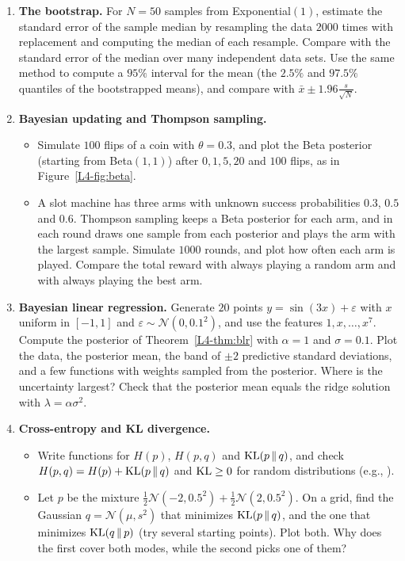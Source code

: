 \begin{enumerate}[label=\textbf{P\arabic*.}, leftmargin=*]
    \item \textbf{The bootstrap.} For $N = 50$ samples from Exponential$(1)$, estimate the standard error of the sample median by resampling the data $2000$ times with replacement and computing the median of each resample. Compare with the standard error of the median over many independent data sets. Use the same method to compute a $95\%$ interval for the mean (the $2.5\%$ and $97.5\%$ quantiles of the bootstrapped means), and compare with $\bar x \pm 1.96\frac{s}{\sqrt{N}}$.

    \item \homework{} \textbf{Bayesian updating and Thompson sampling.}
    \begin{itemize}
        \item Simulate $100$ flips of a coin with $\theta = 0.3$, and plot the Beta posterior (starting from Beta$(1, 1)$) after $0, 1, 5, 20$ and $100$ flips, as in Figure~\ref{L4-fig:beta}.
        \item A slot machine has three arms with unknown success probabilities $0.3$, $0.5$ and $0.6$. Thompson sampling keeps a Beta posterior for each arm, and in each round draws one sample from each posterior and plays the arm with the largest sample. Simulate $1000$ rounds, and plot how often each arm is played. Compare the total reward with always playing a random arm and with always playing the best arm.
    \end{itemize}

    \item \textbf{Bayesian linear regression.} Generate $20$ points $y = \sin(3x) + \varepsilon$ with $x$ uniform in $[-1, 1]$ and $\varepsilon \sim \mathcal{N}(0, 0.1^2)$, and use the features $1, x, \ldots, x^7$. Compute the posterior of Theorem~\ref{L4-thm:blr} with $\alpha = 1$ and $\sigma = 0.1$. Plot the data, the posterior mean, the band of $\pm 2$ predictive standard deviations, and a few functions with weights sampled from the posterior. Where is the uncertainty largest? Check that the posterior mean equals the ridge solution with $\lambda = \alpha\sigma^2$.

    \item \textbf{Cross-entropy and KL divergence.}
    \begin{itemize}
        \item Write functions for $H(p)$, $H(p, q)$ and $\operatorname{KL}(p \,\|\, q)$, and check $H(p, q) = H(p) + \operatorname{KL}(p \,\|\, q)$ and $\operatorname{KL} \geq 0$ for random distributions (e.g., ).
        \item Let $p$ be the mixture $\frac{1}{2}\mathcal{N}(-2, 0.5^2) + \frac{1}{2}\mathcal{N}(2, 0.5^2)$. On a grid, find the Gaussian $q = \mathcal{N}(\mu, s^2)$ that minimizes $\operatorname{KL}(p \,\|\, q)$, and the one that minimizes $\operatorname{KL}(q \,\|\, p)$ (try several starting points). Plot both. Why does the first cover both modes, while the second picks one of them?
    \end{itemize}


\end{enumerate}
